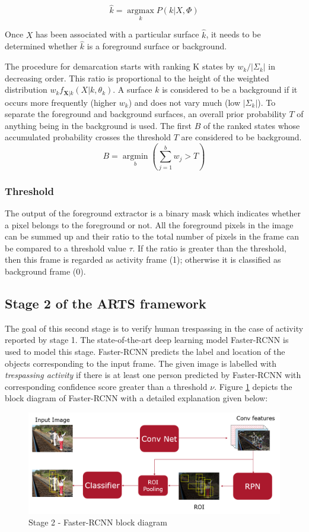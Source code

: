 $$ \hat{k}=\operatorname*{argmax}_k P(k|X,\Phi)$$

Once $X$ has been associated with a particular surface $\hat{k}$, it needs to be determined whether $\hat{k}$ is a foreground surface or background. 

The procedure for demarcation starts with ranking K states by $w_k / | \Sigma_k |$ in decreasing order. This ratio is proportional to the height of the weighted distribution $w_k f_{\mathbf{X}|k}(X|k,\theta_k)$. A surface $k$ is considered to be a background if it occurs more frequently (higher $w_k$) and does not vary much (low $|\Sigma_k|$).  To separate the foreground and background surfaces, an overall prior probability $T$ of anything being in the background is used. The first $B$ of the ranked  states whose accumulated probability crosses the threshold $T$ are considered to be background. 
$$ B=\operatorname*{argmin}_b (\sum_{j=1}^b w_{j} > T)$$ 

\subsubsection{Threshold}
The output of the foreground extractor is a binary mask which indicates whether a pixel belongs to the foreground or not. All the foreground pixels in the image can be summed up and their ratio to the total number of pixels in the frame can be compared to a threshold value $\tau$. If the ratio is greater than the threshold, then this frame is regarded as activity frame (1); otherwise it is classified as background frame (0). 


\subsection{Stage 2 of the ARTS framework}
\label{sec:stage2}
The goal of this second stage is to verify human trespassing in the case of activity reported by stage 1. The state-of-the-art deep learning model Faster-RCNN\cite{ref_fasterrcnn} is used to model this stage. Faster-RCNN predicts the label and location of the objects corresponding to the input frame. The given image is labelled with \textit{trespassing activity} if there is at least one person predicted by Faster-RCNN with corresponding confidence score greater than a threshold $\nu$. Figure \ref{fig:faster-rcnn-pipeline} depicts the block diagram of Faster-RCNN with a detailed explanation given below: 


\begin{figure}
    \centering
    \includegraphics[width=\linewidth]{images/faster-rcnn-pipeline.PNG}
    \caption{Stage 2 - Faster-RCNN block diagram}
    \label{fig:faster-rcnn-pipeline}
\end{figure}

